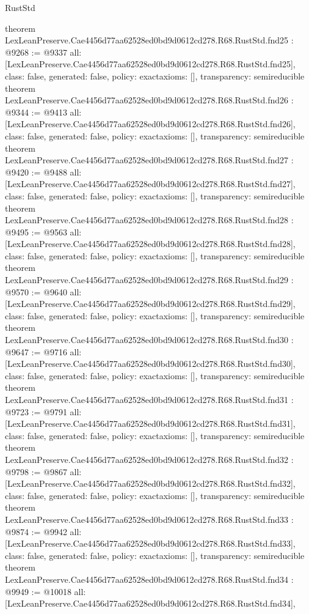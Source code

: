 \begin{lexlean}{RustStd}
\begin{coremodule}
{}
theorem LexLeanPreserve.Cae4456d77aa62528ed0bd9d0612cd278.R68.RustStd.fnd25 : @9268 := @9337 {
  all: [LexLeanPreserve.Cae4456d77aa62528ed0bd9d0612cd278.R68.RustStd.fnd25],
  class: false,
  generated: false,
  policy: exact{axioms: []},
  transparency: semireducible
}
theorem LexLeanPreserve.Cae4456d77aa62528ed0bd9d0612cd278.R68.RustStd.fnd26 : @9344 := @9413 {
  all: [LexLeanPreserve.Cae4456d77aa62528ed0bd9d0612cd278.R68.RustStd.fnd26],
  class: false,
  generated: false,
  policy: exact{axioms: []},
  transparency: semireducible
}
theorem LexLeanPreserve.Cae4456d77aa62528ed0bd9d0612cd278.R68.RustStd.fnd27 : @9420 := @9488 {
  all: [LexLeanPreserve.Cae4456d77aa62528ed0bd9d0612cd278.R68.RustStd.fnd27],
  class: false,
  generated: false,
  policy: exact{axioms: []},
  transparency: semireducible
}
theorem LexLeanPreserve.Cae4456d77aa62528ed0bd9d0612cd278.R68.RustStd.fnd28 : @9495 := @9563 {
  all: [LexLeanPreserve.Cae4456d77aa62528ed0bd9d0612cd278.R68.RustStd.fnd28],
  class: false,
  generated: false,
  policy: exact{axioms: []},
  transparency: semireducible
}
theorem LexLeanPreserve.Cae4456d77aa62528ed0bd9d0612cd278.R68.RustStd.fnd29 : @9570 := @9640 {
  all: [LexLeanPreserve.Cae4456d77aa62528ed0bd9d0612cd278.R68.RustStd.fnd29],
  class: false,
  generated: false,
  policy: exact{axioms: []},
  transparency: semireducible
}
theorem LexLeanPreserve.Cae4456d77aa62528ed0bd9d0612cd278.R68.RustStd.fnd30 : @9647 := @9716 {
  all: [LexLeanPreserve.Cae4456d77aa62528ed0bd9d0612cd278.R68.RustStd.fnd30],
  class: false,
  generated: false,
  policy: exact{axioms: []},
  transparency: semireducible
}
theorem LexLeanPreserve.Cae4456d77aa62528ed0bd9d0612cd278.R68.RustStd.fnd31 : @9723 := @9791 {
  all: [LexLeanPreserve.Cae4456d77aa62528ed0bd9d0612cd278.R68.RustStd.fnd31],
  class: false,
  generated: false,
  policy: exact{axioms: []},
  transparency: semireducible
}
theorem LexLeanPreserve.Cae4456d77aa62528ed0bd9d0612cd278.R68.RustStd.fnd32 : @9798 := @9867 {
  all: [LexLeanPreserve.Cae4456d77aa62528ed0bd9d0612cd278.R68.RustStd.fnd32],
  class: false,
  generated: false,
  policy: exact{axioms: []},
  transparency: semireducible
}
theorem LexLeanPreserve.Cae4456d77aa62528ed0bd9d0612cd278.R68.RustStd.fnd33 : @9874 := @9942 {
  all: [LexLeanPreserve.Cae4456d77aa62528ed0bd9d0612cd278.R68.RustStd.fnd33],
  class: false,
  generated: false,
  policy: exact{axioms: []},
  transparency: semireducible
}
theorem LexLeanPreserve.Cae4456d77aa62528ed0bd9d0612cd278.R68.RustStd.fnd34 : @9949 := @10018 {
  all: [LexLeanPreserve.Cae4456d77aa62528ed0bd9d0612cd278.R68.RustStd.fnd34],
}
\end{coremodule}
\end{lexlean}

